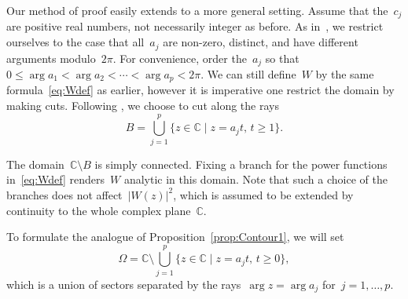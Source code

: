 \documentclass[pdftex]{sigma}
\numberwithin{equation}{section}
\newcommand*{\Cset}{\mathbb{C}} %
\begin{document}
 Our method of proof easily extends to a more general setting. Assume that the~$c_j$ are positive real numbers, not necessarily integer as before. As in~\cite{LY2}, we restrict ourselves to the case that all~$a_j$ are non-zero, distinct, and have different arguments modulo~$2\pi$. For convenience, order the~$a_j$ so that~$0 \leq \arg a_1 < \arg a_2 < \cdots < \arg a_p < 2 \pi$. We can still define~$W$ by the same formula~\eqref{eq:Wdef} as earlier, however it is imperative one restrict the domain by making cuts. Following \cite{LY2}, we choose to cut along the rays
 \begin{equation}
 \label{eq:def_B}
 B = \bigcup_{j=1}^p \{z \in \Cset \mid z = a_j t,\, t \ge 1 \}.
 \end{equation}

 The domain~$\Cset \setminus B$ is simply connected. Fixing a branch for the power functions in~\eqref{eq:Wdef} renders~$W$ analytic in this domain. Note that such a choice of the branches does not affect~$|W(z)|^2$, which is assumed to be extended by continuity to the whole complex plane~$\Cset$.

 To formulate the analogue of Proposition~\ref{prop:Contour1}, we will set
 \begin{equation}
 \label{eq:def_Omega}
 \Omega = \Cset \setminus \bigcup_{j=1}^p \{z \in \Cset \mid z = a_j t,\, t \ge 0 \},
 \end{equation}
 which is a union of sectors separated by the rays~$\arg{z} = \arg{a_j}$ for~$j=1, \dots, p$.
\end{document}
